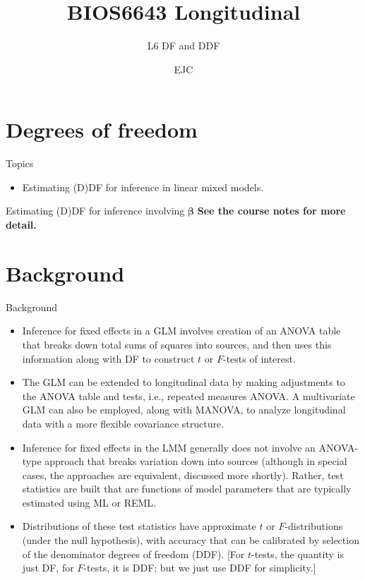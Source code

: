 \documentclass[
  9pt,
  ignorenonframetext,
]{beamer}
\title{BIOS6643 Longitudinal}
\subtitle{L6 DF and DDF}
\author{EJC}
\date{}
\institute{Department of Biostatistics \& Informatics}
\providecommand{\tightlist}{%
  \setlength{\itemsep}{0pt}\setlength{\parskip}{0pt}}
\begin{document}
\frame{\titlepage}

\begin{frame}[allowframebreaks]
  \tableofcontents[hideallsubsections]
\end{frame}
\hypertarget{degrees-of-freedom}{%
\section{Degrees of freedom}\label{degrees-of-freedom}}

\begin{frame}{Topics}
\protect\hypertarget{topics}{}
\begin{itemize}
\tightlist
\item
  Estimating (D)DF for inference in linear mixed models.
\end{itemize}
\end{frame}

\begin{frame}{Estimating (D)DF for inference involving \(\pmb \beta\)}
\protect\hypertarget{estimating-ddf-for-inference-involving-pmb-beta}{}
\textbf{See the course notes for more detail.}
\end{frame}

\hypertarget{background}{%
\section{Background}\label{background}}

\begin{frame}{Background}
\protect\hypertarget{background-1}{}
\begin{itemize}
\item
  Inference for fixed effects in a GLM involves creation of an ANOVA
  table that breaks down total sums of squares into sources, and then
  uses this information along with DF to construct \(t\) or \(F\)-tests
  of interest.
\item
  The GLM can be extended to longitudinal data by making adjustments to
  the ANOVA table and tests, i.e., repeated measures ANOVA. A
  multivariate GLM can also be employed, along with MANOVA, to analyze
  longitudinal data with a more flexible covariance structure.
\item
  Inference for fixed effects in the LMM generally does not involve an
  ANOVA-type approach that breaks variation down into sources (although
  in special cases, the approaches are equivalent, discussed more
  shortly). Rather, test statistics are built that are functions of
  model parameters that are typically estimated using ML or REML.
\item
  Distributions of these test statistics have approximate \(t\) or
  \(F\)-distributions (under the null hypothesis), with accuracy that
  can be calibrated by selection of the denominator degrees of freedom
  (DDF). {[}For \(t\)-tests, the quantity is just DF, for \(F\)-tests,
  it is DDF; but we just use DDF for simplicity.{]}
\end{itemize}
\end{frame}
\end{document}

